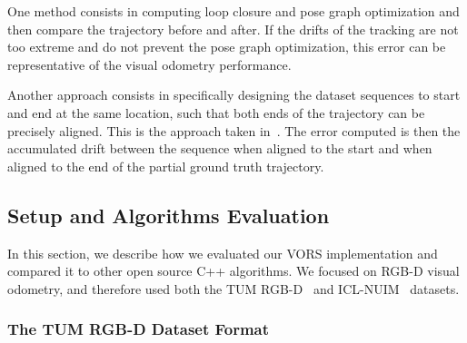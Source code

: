One method consists in computing loop closure and pose graph optimization
and then compare the trajectory before and after.
If the drifts of the tracking are not too extreme and do not prevent the pose graph optimization,
this error can be representative of the visual odometry performance.

Another approach consists in specifically designing the dataset sequences
to start and end at the same location, such that both ends of the trajectory
can be precisely aligned.
This is the approach taken in~\cite{engel2016photometrically}.
The error computed is then the accumulated drift between the sequence when aligned
to the start and when aligned to the end of the partial ground truth trajectory.


\subsection{Setup and Algorithms Evaluation}%
\label{sub:algorithms_eval}

In this section, we describe how we evaluated our VORS implementation
and compared it to other open source C++ algorithms.
We focused on RGB-D visual odometry, and therefore used
both the TUM RGB-D~\cite{sturm2012benchmark} and ICL-NUIM~\cite{handa2014benchmark} datasets.

\subsubsection{The TUM RGB-D Dataset Format}%
\label{ssub:dataset-format}

